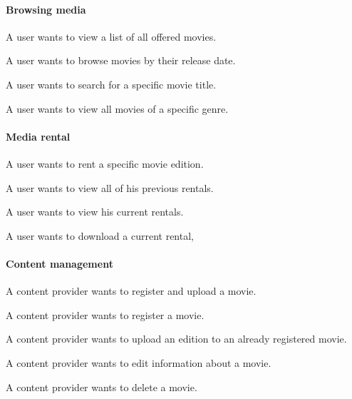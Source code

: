 \paragraph{Browsing media}
\begin{my_itemize}
	\item A user wants to view a list of all offered movies.
	\item A user wants to browse movies by their release date.
	\item A user wants to search for a specific movie title.
	\item A user wants to view all movies of a specific genre.
\end{my_itemize}

\paragraph{Media rental}
\begin{my_itemize}
	\item A user wants to rent a specific movie edition.
	\item A user wants to view all of his previous rentals.
	\item A user wants to view his current rentals.
	\item A user wants to download a current rental,
\end{my_itemize}

\paragraph{Content management}
\begin{my_itemize}
	\item A content provider wants to register and upload a movie.
	\item A content provider wants to register a movie.
	\item A content provider wants to upload an edition to an already registered movie.
	\item A content provider wants to edit information about a movie.
	\item A content provider wants to delete a movie.
\end{my_itemize}